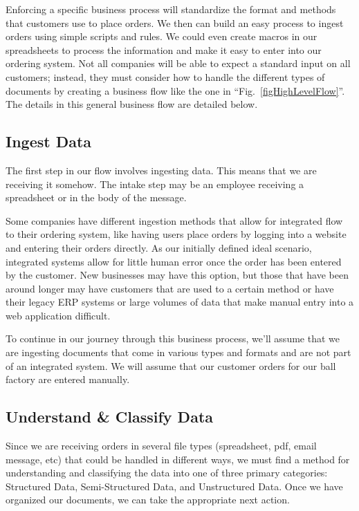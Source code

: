 \documentclass[conference, draftcls]{IEEEtran}
\begin{document}
Enforcing a specific business process will standardize the format and methods that customers use to place orders. We then can build an easy process to ingest orders using simple scripts and rules. We could even create macros in our spreadsheets to process the information and make it easy to enter into our ordering system. Not all companies will be able to expect a standard input on all customers; instead, they must consider how to handle the different types of documents by creating a business flow like the one in ``Fig.~\ref{figHighLevelFlow}''. The details in this general business flow are detailed below.

\subsection{Ingest Data}
The first step in our flow involves ingesting data. This means that we are receiving it somehow. The intake step may be an employee receiving a spreadsheet or in the body of the message.

Some companies have different ingestion methods that allow for integrated flow to their ordering system, like having users place orders by logging into a website and entering their orders directly. As our initially defined ideal scenario, integrated systems allow for little human error once the order has been entered by the customer. New businesses may have this option, but those that have been around longer may have customers that are used to a certain method or have their legacy ERP systems or large volumes of data that make manual entry into a web application difficult.

To continue in our journey through this business process, we'll assume that we are ingesting documents that come in various types and formats and are not part of an integrated system. We will assume that our customer orders for our ball factory are entered manually.

\subsection{Understand \& Classify Data}
Since we are receiving orders in several file types (spreadsheet, pdf, email message, etc) that could be handled in different ways, we must find a method for understanding and classifying the data into one of three primary categories: Structured Data, Semi-Structured Data, and Unstructured Data. Once we have organized our documents, we can take the appropriate next action.
\end{document}
